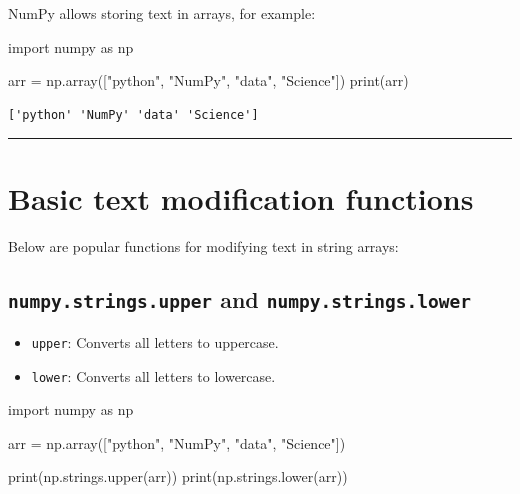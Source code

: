 \documentclass[
  english,
  letterpaper,
  DIV=11,
  numbers=noendperiod]{scrreprt}
\newenvironment{Shaded}{\begin{snugshade}}{\end{snugshade}}
\newcommand{\BuiltInTok}[1]{\textcolor[rgb]{0.00,0.23,0.31}{#1}}
\newcommand{\ImportTok}[1]{\textcolor[rgb]{0.00,0.46,0.62}{#1}}
\newcommand{\NormalTok}[1]{\textcolor[rgb]{0.00,0.23,0.31}{#1}}
\newcommand{\OperatorTok}[1]{\textcolor[rgb]{0.37,0.37,0.37}{#1}}
\newcommand{\StringTok}[1]{\textcolor[rgb]{0.13,0.47,0.30}{#1}}
\providecommand{\tightlist}{%
  \setlength{\itemsep}{0pt}\setlength{\parskip}{0pt}}
\begin{document}
NumPy allows storing text in arrays, for example:

\begin{Shaded}
\begin{Highlighting}[]
\ImportTok{import}\NormalTok{ numpy }\ImportTok{as}\NormalTok{ np}

\NormalTok{arr }\OperatorTok{=}\NormalTok{ np.array([}\StringTok{"python"}\NormalTok{, }\StringTok{"NumPy"}\NormalTok{, }\StringTok{"data"}\NormalTok{, }\StringTok{"Science"}\NormalTok{])}
\BuiltInTok{print}\NormalTok{(arr)}
\end{Highlighting}
\end{Shaded}

\begin{verbatim}
['python' 'NumPy' 'data' 'Science']
\end{verbatim}

\begin{center}\rule{0.5\linewidth}{0.5pt}\end{center}

\section{Basic text modification
functions}\label{basic-text-modification-functions}

Below are popular functions for modifying text in string arrays:

\subsection{\texorpdfstring{\texttt{numpy.strings.upper} and
\texttt{numpy.strings.lower}}{numpy.strings.upper and numpy.strings.lower}}\label{numpy.strings.upper-and-numpy.strings.lower}

\begin{itemize}
\tightlist
\item
  \texttt{upper}: Converts all letters to uppercase.
\item
  \texttt{lower}: Converts all letters to lowercase.
\end{itemize}

\begin{Shaded}
\begin{Highlighting}[]
\ImportTok{import}\NormalTok{ numpy }\ImportTok{as}\NormalTok{ np}

\NormalTok{arr }\OperatorTok{=}\NormalTok{ np.array([}\StringTok{"python"}\NormalTok{, }\StringTok{"NumPy"}\NormalTok{, }\StringTok{"data"}\NormalTok{, }\StringTok{"Science"}\NormalTok{])}

\BuiltInTok{print}\NormalTok{(np.strings.upper(arr))}
\BuiltInTok{print}\NormalTok{(np.strings.lower(arr))}
\end{Highlighting}
\end{Shaded}
\end{document}
